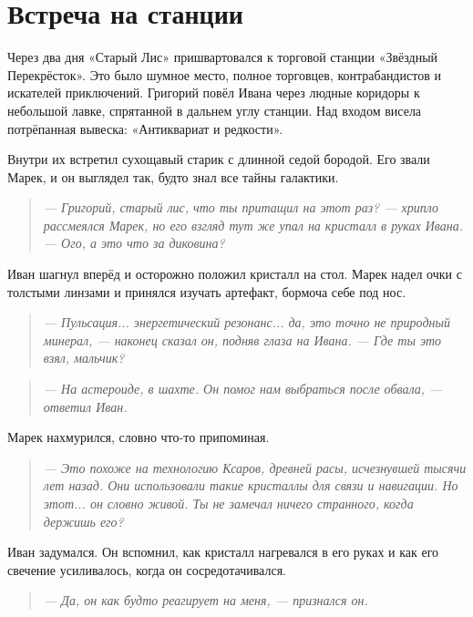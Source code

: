 \documentclass[12pt,a4paper]{book}
\newenvironment{dialogue}{\begin{quote}\itshape}{\end{quote}}
\begin{document}
\section*{Встреча на станции}

Через два дня «Старый Лис» пришвартовался к торговой станции «Звёздный Перекрёсток». Это было шумное место, полное торговцев, контрабандистов и искателей приключений. Григорий повёл Ивана через людные коридоры к небольшой лавке, спрятанной в дальнем углу станции. Над входом висела потрёпанная вывеска: «Антиквариат и редкости».

Внутри их встретил сухощавый старик с длинной седой бородой. Его звали Марек, и он выглядел так, будто знал все тайны галактики.

\begin{dialogue}
--- Григорий, старый лис, что ты притащил на этот раз? --- хрипло рассмеялся Марек, но его взгляд тут же упал на кристалл в руках Ивана. --- Ого, а это что за диковина?
\end{dialogue}

Иван шагнул вперёд и осторожно положил кристалл на стол. Марек надел очки с толстыми линзами и принялся изучать артефакт, бормоча себе под нос.

\begin{dialogue}
--- Пульсация... энергетический резонанс... да, это точно не природный минерал, --- наконец сказал он, подняв глаза на Ивана. --- Где ты это взял, мальчик?
\end{dialogue}

\begin{dialogue}
--- На астероиде, в шахте. Он помог нам выбраться после обвала, --- ответил Иван.
\end{dialogue}

Марек нахмурился, словно что-то припоминая.

\begin{dialogue}
--- Это похоже на технологию Ксаров, древней расы, исчезнувшей тысячи лет назад. Они использовали такие кристаллы для связи и навигации. Но этот... он словно живой. Ты не замечал ничего странного, когда держишь его?
\end{dialogue}

Иван задумался. Он вспомнил, как кристалл нагревался в его руках и как его свечение усиливалось, когда он сосредотачивался.

\begin{dialogue}
--- Да, он как будто реагирует на меня, --- признался он.
\end{dialogue}
\end{document}
